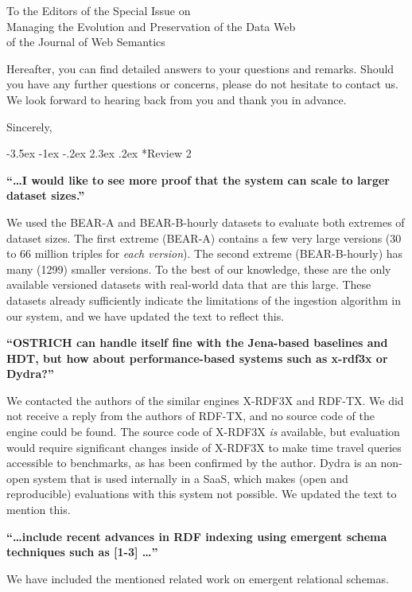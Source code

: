 \documentclass{letter}
\makeatletter
\newcounter{section}
\newcommand\section{\@startsection {section}{1}{\z@}%
                                   {-3.5ex \@plus -1ex \@minus -.2ex}%
                                   {2.3ex \@plus.2ex}%
                                   {\normalfont\Large\bfseries}}
\makeatother
\begin{document}
\begin{letter}{To the Editors of the Special Issue on\\Managing the Evolution and Preservation of the Data Web\\of the Journal of Web Semantics}
\clearpage

Hereafter, you can find detailed answers to your questions and remarks.
Should you have any further questions or concerns, please do not hesitate to contact us.
We look forward to hearing back from you and thank you in advance.

\bigskip

\closing{Sincerely,}

\pagebreak
\section*{Review 2}

\textbf{\enquote{\ldots I would like to see more proof that the system can scale to larger dataset sizes.}}

We used the BEAR-A and BEAR-B-hourly datasets to evaluate both extremes of dataset sizes.
The first extreme (BEAR-A) contains a few very large versions (30 to 66 million triples for \emph{each version}).
The second extreme (BEAR-B-hourly) has many (1299) smaller versions.
To the best of our knowledge, these are the only available versioned datasets with real-world data
that are this large.
These datasets already sufficiently indicate the limitations of the ingestion algorithm in our system,
and we have updated the text to reflect this.

\textbf{\enquote{OSTRICH can handle itself fine with the Jena-based baselines and HDT, but how about performance-based systems such as x-rdf3x or Dydra?}}

We contacted the authors of the similar engines X-RDF3X and RDF-TX.
We did not receive a reply from the authors of RDF-TX, and no source code of the engine could be found.
The source code of X-RDF3X \emph{is} available, but evaluation would require significant changes inside of X-RDF3X
to make time travel queries accessible to benchmarks, as has been confirmed by the author.
Dydra is an non-open system that is used internally in a SaaS, which makes (open and reproducible) evaluations with this system not possible.
We updated the text to mention this.

\textbf{\enquote{\ldots include recent advances in RDF indexing using emergent schema techniques such as [1-3] \ldots}}

We have included the mentioned related work on emergent relational schemas.


\end{letter}
\end{document}
